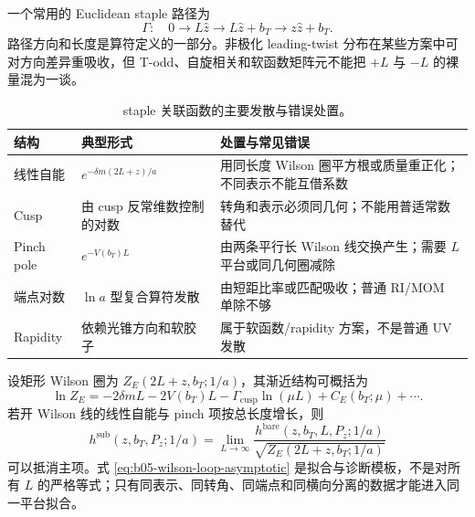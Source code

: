 一个常用的 Euclidean staple 路径为
\begin{equation}
  \Gamma:\quad 0\longrightarrow L\hat z
  \longrightarrow L\hat z+b_T
  \longrightarrow z\hat z+b_T .
  \label{eq:b05-staple-path}
\end{equation}
路径方向和长度是算符定义的一部分。非极化 leading-twist 分布在某些方案中可对方向差异重吸收，但 T-odd、自旋相关和软函数矩阵元不能把 \(+L\) 与 \(-L\) 的裸量混为一谈。

\begin{table}[H]
  \centering
  \caption{staple 关联函数的主要发散与错误处置。}
  \label{tab:b05-staple-divergences}
  \small
  \begin{tabularx}{\textwidth}{@{}p{}p{}X@{}}
    \toprule
    结构 & 典型形式 & 处置与常见错误 \\
    \midrule
    线性自能 & \(e^{-\delta m(2L+z)/a}\) & 用同长度 Wilson 圈平方根或质量重正化；不同表示不能互借系数 \\
    Cusp & 由 cusp 反常维数控制的对数 & 转角和表示必须同几何；不能用普适常数替代 \\
    Pinch pole & \(e^{-V(b_T)L}\) & 由两条平行长 Wilson 线交换产生；需要 \(L\) 平台或同几何圈减除 \\
    端点对数 & \(\ln a\) 型复合算符发散 & 由短距比率或匹配吸收；普通 RI/MOM 单除不够 \\
    Rapidity & 依赖光锥方向和软胶子 & 属于软函数/rapidity 方案，不是普通 UV 发散 \\
    \bottomrule
  \end{tabularx}
\end{table}

设矩形 Wilson 圈为 \(Z_E(2L+z,b_T;1/a)\)，其渐近结构可概括为
\begin{equation}
  \ln Z_E
  =-2\delta m L-2V(b_T)L
   -\Gamma_{\mathrm{cusp}}\ln(\mu L)
   +C_E(b_T;\mu)+\cdots .
  \label{eq:b05-wilson-loop-asymptotic}
\end{equation}
若开 Wilson 线的线性自能与 pinch 项按总长度增长，则
\begin{equation}
  h^{\mathrm{sub}}(z,b_T,P_z;1/a)
  =\lim_{L\to\infty}
   \frac{h^{\mathrm{bare}}(z,b_T,L,P_z;1/a)}
        {\sqrt{Z_E(2L+z,b_T;1/a)}}
  \label{eq:b05-wilson-loop-subtraction}
\end{equation}
可以抵消主项。式 \eqref{eq:b05-wilson-loop-asymptotic} 是拟合与诊断模板，不是对所有 \(L\) 的严格等式；只有同表示、同转角、同端点和同横向分离的数据才能进入同一平台拟合。

